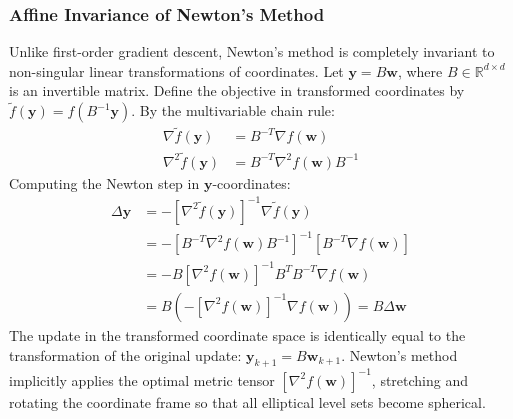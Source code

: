 \subsubsection{Affine Invariance of Newton's Method}
Unlike first-order gradient descent, Newton's method is completely invariant to non-singular linear transformations of coordinates.
Let $\mathbf{y} = B \mathbf{w}$, where $B \in \mathbb{R}^{d \times d}$ is an invertible matrix. Define the objective in transformed coordinates by $\tilde{f}(\mathbf{y}) = f(B^{-1}\mathbf{y})$.
By the multivariable chain rule:
\begin{align}
\nabla \tilde{f}(\mathbf{y}) &= B^{-T} \nabla f(\mathbf{w}) \\
\nabla^2 \tilde{f}(\mathbf{y}) &= B^{-T} \nabla^2 f(\mathbf{w}) B^{-1}
\end{align}
Computing the Newton step in $\mathbf{y}$-coordinates:
\begin{align}
\Delta \mathbf{y} &= -[\nabla^2 \tilde{f}(\mathbf{y})]^{-1} \nabla \tilde{f}(\mathbf{y}) \nonumber \\
&= -\left[ B^{-T} \nabla^2 f(\mathbf{w}) B^{-1} \right]^{-1} \left[ B^{-T} \nabla f(\mathbf{w}) \right] \nonumber \\
&= -B [\nabla^2 f(\mathbf{w})]^{-1} B^T B^{-T} \nabla f(\mathbf{w}) \nonumber \\
&= B \left( -[\nabla^2 f(\mathbf{w})]^{-1} \nabla f(\mathbf{w}) \right) = B \Delta \mathbf{w}
\end{align}
The update in the transformed coordinate space is identically equal to the transformation of the original update: $\mathbf{y}_{k+1} = B \mathbf{w}_{k+1}$. Newton's method implicitly applies the optimal metric tensor $[\nabla^2 f(\mathbf{w})]^{-1}$, stretching and rotating the coordinate frame so that all elliptical level sets become spherical.

